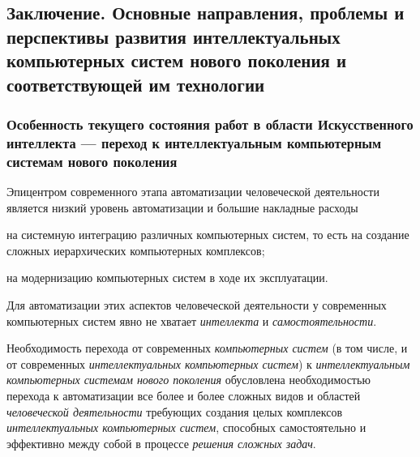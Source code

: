 \begin{partbacktext}
\part*{Заключение. Основные направления, проблемы и перспективы развития интеллектуальных компьютерных систем нового поколения и соответствующей им технологии}
\label{part_conclusion}

\vspace{-3\baselineskip}

	
\end{partbacktext}

\section*{Особенность текущего состояния работ в области Искусственного интеллекта --- переход к интеллектуальным компьютерным системам нового поколения}
\label{concl_feature_current_state_work_field_AI}

Эпицентром современного этапа автоматизации человеческой деятельности является низкий уровень автоматизации и большие накладные расходы
\begin{textitemize}
	\item на системную интеграцию различных компьютерных систем, то есть на создание сложных иерархических компьютерных комплексов;
	\item на модернизацию компьютерных систем в ходе их эксплуатации.
\end{textitemize}

Для автоматизации этих аспектов человеческой деятельности у современных компьютерных систем явно не хватает \textit{интеллекта} и \textit{самостоятельности}.

Необходимость перехода от современных \textit{компьютерных систем} (в том числе, и от современных \textit{интеллектуальных компьютерных систем}) к \textit{интеллектуальным компьютерных системам нового поколения} обусловлена необходимостью перехода к автоматизации все более и более сложных видов и областей \textit{человеческой деятельности} требующих создания целых комплексов \textit{интеллектуальных компьютерных систем}, способных самостоятельно  и эффективно  между собой в процессе \textit{ решения сложных задач}.


